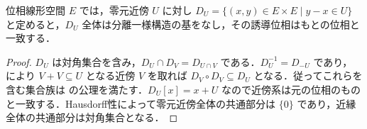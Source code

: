 \begin{prop}[位相線形空間の標準一様構造]
位相線形空間 $E$ では，零元近傍 $U$ に対し $D_U=\{(x,y)\in E\times E\mid y-x\in U\}$ と定めると，$D_U$ 全体は分離一様構造の基をなし，その誘導位相はもとの位相と一致する．
\end{prop}
\begin{proof}
$D_U$ は対角集合を含み，$D_U\cap D_V=D_{U\cap V}$ である．$D_U^{-1}=D_{-U}$ であり， により $V+V\subseteq U$ となる近傍 $V$ を取れば $D_V\circ D_V\subseteq D_U$ となる．従ってこれらを含む集合族は  の公理を満たす．$D_U[x]=x+U$ なので近傍系は元の位相のものと一致する．Hausdorff性によって零元近傍全体の共通部分は $\{0\}$ であり，近縁全体の共通部分は対角集合となる．
\end{proof}
